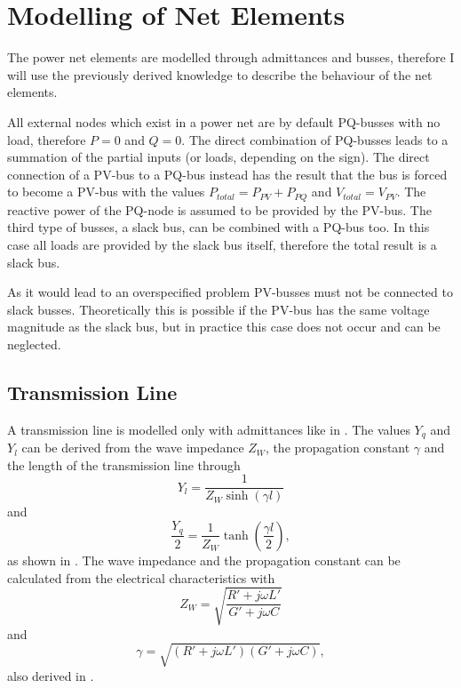 \section{Modelling of Net Elements}

The power net elements are modelled through admittances and busses, therefore I will use the previously derived knowledge to describe the behaviour of the net elements.

All external nodes which exist in a power net are by default PQ-busses with no load, therefore $P = 0$ and $Q = 0$. The direct combination of PQ-busses leads to a summation of the partial inputs (or loads, depending on the sign). The direct connection of a PV-bus to a PQ-bus instead has the result that the bus is forced to become a PV-bus with the values $P_{total} = P_{PV} + P_{PQ}$ and $V_{total} = V_{PV}$. The reactive power of the PQ-node is assumed to be provided by the PV-bus. The third type of busses, a slack bus, can be combined with a PQ-bus too. In this case all loads are provided by the slack bus itself, therefore the total result is a slack bus.

As it would lead to an overspecified problem PV-busses must not be connected to slack busses. Theoretically this is possible if the PV-bus has the same voltage magnitude as the slack bus, but in practice this case does not occur and can be neglected.

\subsection{Transmission Line}
A transmission line is modelled only with admittances like in . The values $Y_q$ and $Y_l$ can be derived from the wave impedance $Z_W$, the propagation constant $\gamma$ and the length of the transmission line through
\begin{equation}
	Y_l = \frac{1}{Z_W \sinh \left( \gamma l \right)}
\end{equation}
and
\begin{equation}
	\frac{Y_q}{2} = \frac{1}{Z_W} \tanh \left( \frac{\gamma l}{2} \right),
\end{equation}
as shown in \citep[p. 155]{powerSystemAnalysis}. The wave impedance and the propagation constant can be calculated from the electrical characteristics with
\begin{equation}
	Z_W = \sqrt{\frac{R' + j \omega L'}{G' + j \omega C}}
\end{equation}
and 
\begin{equation}
	\gamma = \sqrt{\left( R' + j \omega L' \right) \left( G' + j \omega C \right)},
\end{equation}
also derived in \citep[p. 153]{powerSystemAnalysis}.

